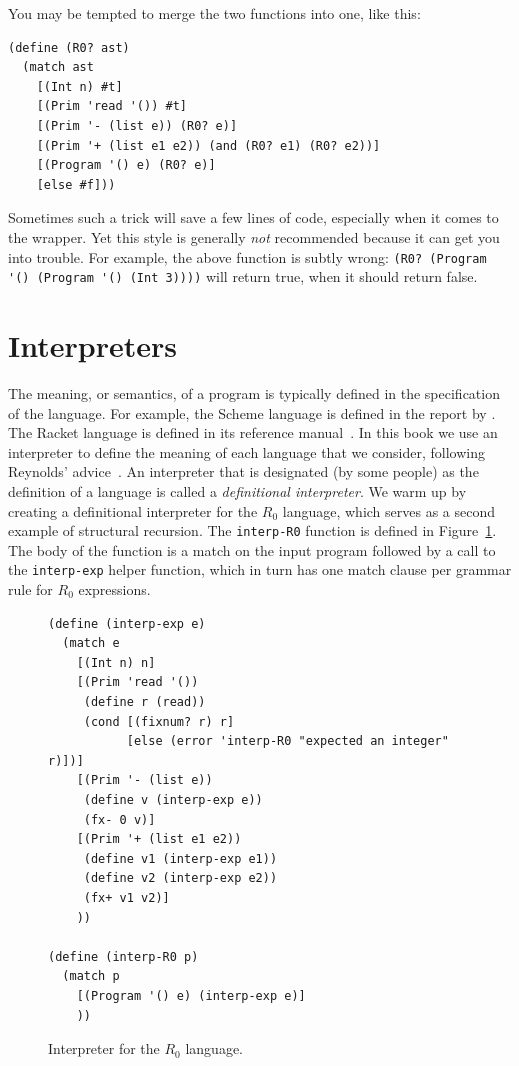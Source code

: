 \documentclass[11pt]{book}
\begin{document}
You may be tempted to merge the two functions into one, like this:
\begin{center}
\begin{minipage}{0.5\textwidth}
\begin{lstlisting}
(define (R0? ast)
  (match ast
    [(Int n) #t]
    [(Prim 'read '()) #t]
    [(Prim '- (list e)) (R0? e)]
    [(Prim '+ (list e1 e2)) (and (R0? e1) (R0? e2))]
    [(Program '() e) (R0? e)]
    [else #f]))
\end{lstlisting}
\end{minipage}
\end{center}
%
Sometimes such a trick will save a few lines of code, especially when
it comes to the  wrapper.  Yet this style is generally
\emph{not} recommended because it can get you into trouble.
%
For example, the above function is subtly wrong:
\lstinline{(R0? (Program '() (Program '() (Int 3))))}
will return true, when it should return false.



\section{Interpreters}
\label{sec:interp-R0}

The meaning, or semantics, of a program is typically defined in the
specification of the language. For example, the Scheme language is
defined in the report by \cite{SPERBER:2009aa}. The Racket language is
defined in its reference manual~\citep{plt-tr}. In this book we use an
interpreter to define the meaning of each language that we consider,
following Reynolds' advice~\citep{reynolds72:_def_interp}. An
interpreter that is designated (by some people) as the definition of a
language is called a \emph{definitional interpreter}.  We warm up by
creating a definitional interpreter for the $R_0$ language, which
serves as a second example of structural recursion. The
\texttt{interp-R0} function is defined in
Figure~\ref{fig:interp-R0}. The body of the function is a match on the
input program followed by a call to the \lstinline{interp-exp} helper
function, which in turn has one match clause per grammar rule for
$R_0$ expressions.

\begin{figure}[tp]
\begin{lstlisting}
(define (interp-exp e)
  (match e
    [(Int n) n]
    [(Prim 'read '())
     (define r (read))
     (cond [(fixnum? r) r]
           [else (error 'interp-R0 "expected an integer" r)])]
    [(Prim '- (list e))
     (define v (interp-exp e))
     (fx- 0 v)]
    [(Prim '+ (list e1 e2))
     (define v1 (interp-exp e1))
     (define v2 (interp-exp e2))
     (fx+ v1 v2)]
    ))

(define (interp-R0 p)
  (match p
    [(Program '() e) (interp-exp e)]
    ))
\end{lstlisting}
\caption{Interpreter for the $R_0$ language.}
\label{fig:interp-R0}
\end{figure}
\end{document}
